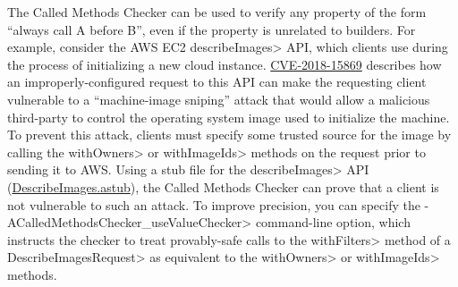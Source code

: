 
The Called Methods Checker can be used to verify any property of the form ``always call A before B'', even
if the property is unrelated to builders. For example, consider the AWS EC2 \<describeImages> API, which
clients use during the process of initializing a new cloud instance.
\href{https://cve.mitre.org/cgi-bin/cvename.cgi?name=CVE-2018-15869}{CVE-2018-15869} describes how an
improperly-configured request to this API can make the requesting client vulnerable to a ``machine-image sniping''
attack that would allow a malicious third-party to control the operating system image used to initialize the
machine. To prevent this attack, clients must specify some trusted source for the image by calling the
\<withOwners> or \<withImageIds> methods on the request prior to sending it to AWS\@. Using a stub file for the
\<describeImages> API
(\href{https://github.com/typetools/checker-framework/blob/master/checker/src/main/java/org/checkerframework/calledmethods/DescribeImages.astub}{DescribeImages.astub}),
the Called Methods Checker can prove that a client is not vulnerable to such an attack. To improve precision, you
can specify the \<-ACalledMethodsChecker\_useValueChecker> command-line option, which instructs the checker to treat
provably-safe calls to the \<withFilters> method of a \<DescribeImagesRequest> as equivalent to the \<withOwners> or
\<withImageIds> methods.
